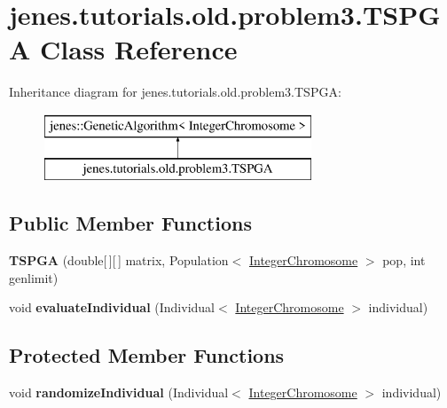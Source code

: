 \hypertarget{classjenes_1_1tutorials_1_1old_1_1problem3_1_1_t_s_p_g_a}{\section{jenes.\-tutorials.\-old.\-problem3.\-T\-S\-P\-G\-A Class Reference}
\label{classjenes_1_1tutorials_1_1old_1_1problem3_1_1_t_s_p_g_a}
}
Inheritance diagram for jenes.\-tutorials.\-old.\-problem3.\-T\-S\-P\-G\-A\-:\begin{figure}[H]
\begin{center}
\leavevmode
\includegraphics[height=2.000000cm]{classjenes_1_1tutorials_1_1old_1_1problem3_1_1_t_s_p_g_a}
\end{center}
\end{figure}
\subsection*{Public Member Functions}
\begin{DoxyCompactItemize}
\item 
\hypertarget{classjenes_1_1tutorials_1_1old_1_1problem3_1_1_t_s_p_g_a_aee42308116b327b1b73b5996bcb39aba}{{\bfseries T\-S\-P\-G\-A} (double\mbox{[}$\,$\mbox{]}\mbox{[}$\,$\mbox{]} matrix, Population$<$ \hyperlink{classjenes_1_1chromosome_1_1_integer_chromosome}{Integer\-Chromosome} $>$ pop, int genlimit)}\label{classjenes_1_1tutorials_1_1old_1_1problem3_1_1_t_s_p_g_a_aee42308116b327b1b73b5996bcb39aba}

\item 
\hypertarget{classjenes_1_1tutorials_1_1old_1_1problem3_1_1_t_s_p_g_a_a4485dcb637c0d0352c4372e4bef4da18}{void {\bfseries evaluate\-Individual} (Individual$<$ \hyperlink{classjenes_1_1chromosome_1_1_integer_chromosome}{Integer\-Chromosome} $>$ individual)}\label{classjenes_1_1tutorials_1_1old_1_1problem3_1_1_t_s_p_g_a_a4485dcb637c0d0352c4372e4bef4da18}

\end{DoxyCompactItemize}
\subsection*{Protected Member Functions}
\begin{DoxyCompactItemize}
\item 
\hypertarget{classjenes_1_1tutorials_1_1old_1_1problem3_1_1_t_s_p_g_a_ae2fb356349da4c72fec6398f226877c9}{void {\bfseries randomize\-Individual} (Individual$<$ \hyperlink{classjenes_1_1chromosome_1_1_integer_chromosome}{Integer\-Chromosome} $>$ individual)}\label{classjenes_1_1tutorials_1_1old_1_1problem3_1_1_t_s_p_g_a_ae2fb356349da4c72fec6398f226877c9}

\end{DoxyCompactItemize}


